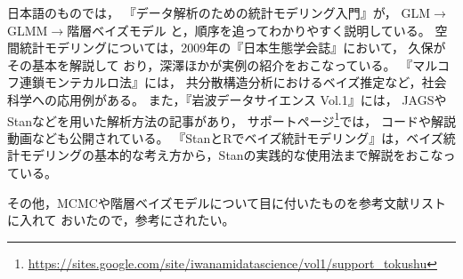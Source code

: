 \documentclass[11pt,uplatex]{jsarticle}
\begin{document}
日本語のものでは，
『データ解析のための統計モデリング入門』\cite{Kubo:Modeling}が，
GLM$\rightarrow$GLMM$\rightarrow$階層ベイズモデル
と，順序を追ってわかりやすく説明している。
空間統計モデリングについては，2009年の『日本生態学会誌』において，
久保\cite{Kubo}がその基本を解説して
おり，深澤ほか\cite{Fukasawa_et_al}が実例の紹介をおこなっている。
『マルコフ連鎖モンテカルロ法』\cite{Toyoda}には，
共分散構造分析におけるベイズ推定など，社会科学への応用例がある。
また，『岩波データサイエンス Vol.1』\cite{Iwanami_vol1}には，
\textsf{JAGS}や\textsf{Stan}などを用いた解析方法の記事があり，
サポートページ\footnote{\url{https://sites.google.com/site/iwanamidatascience/vol1/support_tokushu}}では，
コードや解説動画なども公開されている。
『StanとRでベイズ統計モデリング』\cite{Matsuura}は，ベイズ統計モデリングの基本的な考え方から，\textsf{Stan}の実践的な使用法まで解説をおこなっている。

その他，MCMCや階層ベイズモデルについて目に付いたものを参考文献リストに入れて
おいたので，参考にされたい。

\end{document}
